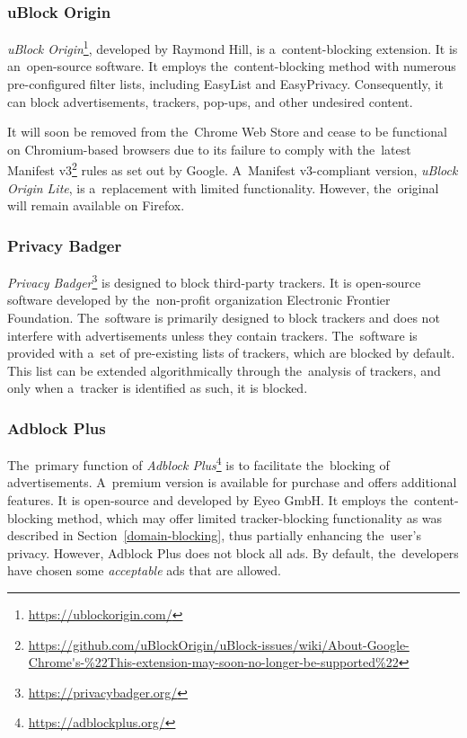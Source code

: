 \subsubsection{uBlock Origin}
\label{ublock-description}
\textit{uBlock Origin}\footnote{\url{https://ublockorigin.com/}}, developed by Raymond Hill, is a~content-blocking extension. It is an~open-source software. It employs the~content-blocking method with numerous pre-configured filter lists, including EasyList and EasyPrivacy. Consequently, it can block advertisements, trackers, pop-ups, and other undesired content. 

It will soon be removed from the~Chrome Web Store and cease to be functional on Chromium-based browsers due to its failure to comply with the~latest Manifest v3\footnote{\url{https://github.com/uBlockOrigin/uBlock-issues/wiki/About-Google-Chrome's-\%22This-extension-may-soon-no-longer-be-supported\%22}} rules as set out by Google. A~Manifest v3-compliant version, \textit{uBlock Origin Lite}, is a~replacement with limited functionality. However, the~original will remain available on Firefox.

\subsubsection{Privacy Badger}
\textit{Privacy Badger}\footnote{\url{https://privacybadger.org/}} is designed to block third-party trackers. It is open-source software developed by the~non-profit organization Electronic Frontier Foundation. The~software is primarily designed to block trackers and does not interfere with advertisements unless they contain trackers. The~software is provided with a~set of pre-existing lists of trackers, which are blocked by default. This list can be extended algorithmically through the~analysis of trackers, and only when a~tracker is identified as such, it is blocked.

\subsubsection{Adblock Plus}
The~primary function of \textit{Adblock Plus}\footnote{\url{https://adblockplus.org/}} is to facilitate the~blocking of advertisements. A~premium version is available for purchase and offers additional features. It is open-source and developed by Eyeo GmbH. It employs the~content-blocking method, which may offer limited tracker-blocking functionality as was described in Section~\ref{domain-blocking}, thus partially enhancing the~user's privacy. However, Adblock Plus does not block all ads. By default, the~developers have chosen some \textit{acceptable} ads that are allowed.

